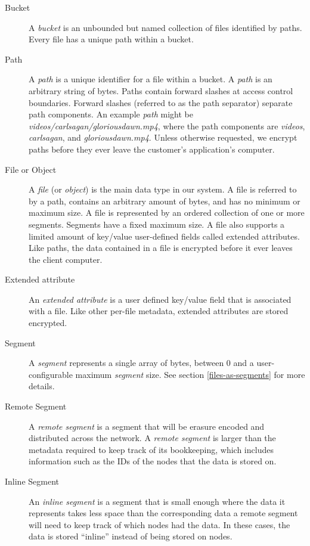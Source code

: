 \documentclass[8pt,fleqn,openany]{book}
\newcommand{\code}[1]{{\em #1}}
\begin{document}
\begin{description}
\item[Bucket] A {\em bucket} is an unbounded but named collection of files
identified by paths. Every file has a unique path within a bucket.

\item[Path] A {\em path} is a unique identifier for a file within a
bucket. A {\em path} is an arbitrary string of bytes. Paths contain forward
slashes at access control boundaries. Forward slashes (referred to as the path
separator) separate path components.
An example {\em path} might be \code{videos/carlsagan/gloriousdawn.mp4}, where
the path components are \code{videos}, \code{carlsagan}, and
\code{gloriousdawn.mp4}.
Unless otherwise requested, we encrypt paths before they ever leave the
customer's application's computer.

\item[File or Object] A {\em file} (or {\em object}) is the main data type in
our system. A file is referred to by a path, contains an arbitrary amount of
bytes, and has no minimum or maximum size. A file is represented by an ordered
collection of one or more segments. Segments have a fixed maximum size.
A file also supports a limited amount of key/value user-defined fields
called extended attributes.
Like paths, the data contained in a file is encrypted before it ever
leaves the client computer.

\item[Extended attribute] An {\em extended attribute} is a user defined key/value
field that is associated with a file. Like other per-file metadata,
extended attributes are stored encrypted.

\item[Segment] A {\em segment} represents a single array of bytes, between 0 and a
user-configurable maximum {\em segment} size.
See section \ref{files-as-segments} for more details.

\item[Remote Segment] A {\em remote segment} is a segment that will be erasure
encoded and distributed across the network. A {\em remote segment} is larger than
the metadata required to keep track of its bookkeeping, which includes
information such as the IDs of the nodes that the data is stored on.

\item[Inline Segment] An {\em inline segment} is a segment that is small
enough where the data it represents takes less space than the corresponding
data a remote segment will need to keep track of which nodes had the data.
In these cases, the data is stored ``inline'' instead of being stored on nodes.


\end{description}
\end{document}
